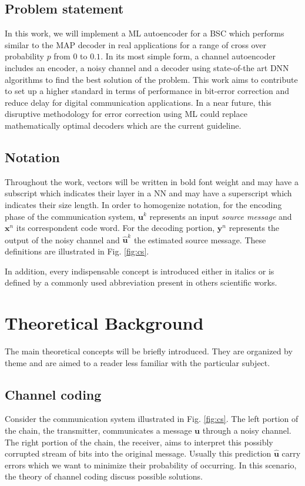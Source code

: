 \documentclass[conference]{IEEEtran}
\begin{document}
\subsection{Problem statement}

In this work, we will implement a ML autoencoder for a BSC which performs similar to the MAP decoder in real applications for a range of cross over probability $p$ from $0$ to $0.1$. In its most simple form, a channel autoencoder includes an encoder, a noisy channel and a decoder using state-of-the art DNN algorithms to find the best solution of the problem. This work aims to contribute to set up a higher standard in terms of performance in bit-error correction and reduce delay for digital communication applications. In a near future, this disruptive methodology for error correction using ML could replace mathematically optimal decoders which are the current guideline.


\subsection{Notation}
Throughout the work, vectors will be written in bold font weight and may  have a subscript which indicates their layer in a NN and may have a superscript which indicates their size length. In order to homogenize notation, for the encoding phase of the communication system, $\textbf{u}^k$ represents an input \textit{source message} and $\textbf{x}^n$ its correspondent code word. For the decoding portion, $\textbf{y}^n$ represents the output of the noisy channel and $\hat{\textbf{u}}^k$ the estimated source message. These definitions are illustrated in Fig. \ref{fig:cs}.

In addition, every indispensable concept is introduced either in italics or is defined by a commonly used abbreviation present in others scientific works.


\section{Theoretical Background}

The main theoretical concepts will be briefly introduced. They are organized by theme and are aimed to a reader less familiar with the particular subject. 

\subsection{Channel coding}
Consider the communication system illustrated in Fig. \ref{fig:cs}. The left portion of the chain, the transmitter, communicates a message $\textbf{u}$ through a noisy channel. The right portion of the chain, the receiver, aims to interpret this possibly corrupted stream of bits into the original message. Usually this prediction $\hat{\textbf{u}}$ carry errors which we want to minimize their probability of occurring. In this scenario, the theory of channel coding discuss possible solutions. 
\end{document}
